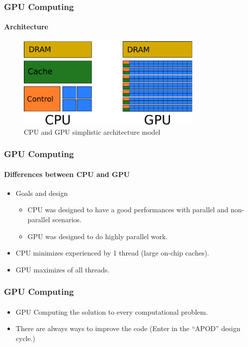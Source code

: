 \begin{frame}
    \frametitle{GPU Computing}
    \framesubtitle{Architecture}
    \begin{figure}
        \centering
        \label{fig:architecture}
        \includegraphics[width=0.8\textwidth]{img/architecture.pdf}
        \caption{CPU and GPU simplistic architecture model}
    \end{figure}
\end{frame}

\begin{frame}
    \frametitle{GPU Computing}
    \framesubtitle{Differences between CPU and GPU}
    \begin{itemize}
        \item Goals and design
        \begin{itemize}
            \item CPU was designed to have a good performances with parallel and non-parallel
                  scenarios.
            \item GPU was designed to do highly parallel work.
        \end{itemize}
        \item CPU minimizes  experienced by 1 thread (large on-chip caches).
        \item GPU maximizes  of all threads.
    \end{itemize}
\end{frame}

\begin{frame}
    \frametitle{GPU Computing}
    \framesubtitle{}
    \begin{itemize}
        \item GPU Computing  the solution to every computational problem.
        \item There are always ways to improve the code (Enter in the ``APOD'' design cycle.)
    \end{itemize}
\end{frame}

